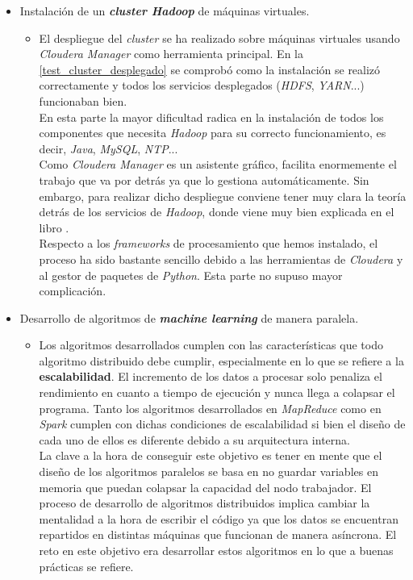 \begin{itemize}
  \item Instalación de un \textbf{\textit{cluster Hadoop}} de máquinas virtuales.
  \begin{itemize}
    \item[] El despliegue del \textit{cluster} se ha realizado sobre máquinas virtuales usando \textit{Cloudera Manager}
            como herramienta principal. En la \autoref{test_cluster_desplegado} se comprobó como la instalación
            se realizó correctamente y todos los servicios desplegados (\textit{HDFS}, \textit{YARN}...) funcionaban bien.\\
            En esta parte la mayor dificultad radica en la instalación de todos los componentes que necesita 
            \textit{Hadoop} para su correcto funcionamiento, es decir, \textit{Java}, \textit{MySQL}, \textit{NTP}...\\
            Como \textit{Cloudera Manager} es un asistente gráfico, facilita enormemente el trabajo que va por detrás
            ya que lo gestiona automáticamente. Sin embargo, para realizar dicho despliegue conviene tener muy clara
            la teoría detrás de los servicios de \textit{Hadoop}, donde viene muy bien explicada en el libro 
            \cite{White:2009:HDG:1717298}.\\
            Respecto a los \textit{frameworks} de procesamiento que hemos instalado, el proceso ha sido bastante sencillo
            debido a las herramientas de \textit{Cloudera} y al gestor de paquetes de \textit{Python}. Esta parte no
            supuso mayor complicación.
  \end{itemize}
  \item Desarrollo de algoritmos de \textbf{\textit{machine learning}} de manera paralela.
  \begin{itemize}
    \item[] Los algoritmos desarrollados cumplen con las características que todo algoritmo distribuido debe cumplir,
            especialmente en lo que se refiere a la \textbf{escalabilidad}. El incremento de los datos a procesar solo
            penaliza el rendimiento en cuanto a tiempo de ejecución y nunca llega a colapsar el programa. 
            Tanto los algoritmos desarrollados en \textit{MapReduce} como en \textit{Spark} cumplen con dichas 
            condiciones de escalabilidad si bien el diseño de cada uno de ellos es diferente debido a su 
            arquitectura interna.\\
            La clave a la hora de conseguir este objetivo es tener en mente que el diseño de los algoritmos paralelos
            se basa en no guardar variables en memoria que puedan colapsar la capacidad del nodo trabajador.
            El proceso de desarrollo de algoritmos distribuidos implica cambiar la mentalidad a la hora de escribir
            el código ya que los datos se encuentran repartidos en distintas máquinas que funcionan de manera 
            asíncrona. El reto en este objetivo era desarrollar estos algoritmos en lo que a buenas prácticas se refiere.
  \end{itemize} 
\end{itemize}

